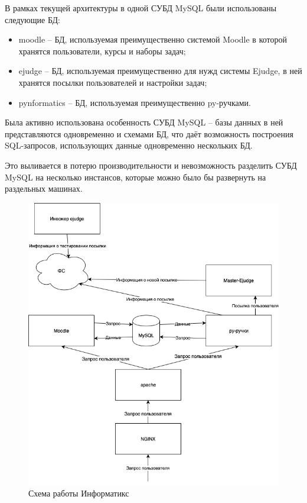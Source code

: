 В рамках текущей архитектуры в одной СУБД MySQL были использованы следующие БД:
\begin{itemize}
    \item moodle -- БД, используемая преимущественно системой Moodle в которой хранятся пользователи, курсы и наборы задач;
    \item ejudge -- БД, используемая преимущественно для нужд системы Ejudge, в ней хранятся посылки пользователей и настройки задач;
    \item pynformatics -- БД, используемая преимущественно py-ручками.
\end{itemize}
Была активно использована особенность СУБД MySQL -- базы данных в ней представляются одновременно и схемами БД, 
что даёт возможность построения SQL-запросов, использующих данные одновременно нескольких БД.


Это выливается в потерю производительности и невозможность разделить СУБД MySQL на несколько инстансов, 
которые можно было бы развернуть на раздельных машинах.

\begin{figure}
  \centering
  \includegraphics[width=\textwidth]{figures/old_informatics.png}
  \caption{Схема работы Информатикс}
  \label{fig:old_informatics}
\end{figure}


